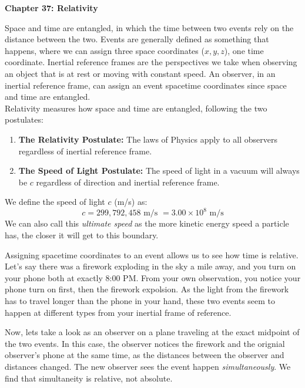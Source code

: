 \documentclass[11pt]{article}
\begin{document}
    \noindent \textbf{Chapter 37: Relativity}

    \vspace{1em}
    \noindent Space and time are entangled,
    in which the time between two events rely on the distance between the two.
    Events are generally defined as something that happens, where we can assign three space coordinates ($x,y,z$), one time coordinate.
    Inertial reference frames are the perspectives we take when observing an object that is at rest or moving with constant speed.
    An observer, in an inertial reference frame, can assign an event spacetime coordinates since space and time are entangled.\\
    
    \noindent \vspace{1em}
    Relativity measures how space and time are entangled, following the two postulates:
    \begin{enumerate}
      \item \textbf{The Relativity Postulate:}
        The laws of Physics apply to all observers regardless of inertial reference frame.
      \item \textbf{The Speed of Light Postulate:}
        The speed of light in  a vacuum will always be $c$ regardless of direction and inertial reference frame.
    \end{enumerate}    
    We define the speed of light $c$ (m/s) as:
    \begin{equation}
      c = 299,792,458 \text{ m/s } = 3.00 \times 10^8 \text{ m/s} \tag{speed of light}
    \end{equation}
    We can also call this \textit{ultimate speed} as the more kinetic energy speed a particle has, the closer it will get to this boundary.
    \vspace{1em}

    \noindent Assigning spacetime coordinates to an event allows us to see how time is relative.
    Let's say there was a firework exploding in the sky a mile away, and you turn on your phone both at exactly 8:00 PM.
    From your own observation, you notice your phone turn on first, then the firework expolsion.
    As the light from the firework has to travel longer than the phone in your hand,
    these two events seem to happen at different types from your inertial frame of reference.
    
    \vspace{1em}
    \noindent Now, lets take a look as an observer on a plane traveling at the exact midpoint of the two events.
    In this case, the observer notices the firework and the orignial observer's phone at the same time,
    as the distances between the observer and distances changed.
    The new observer sees the event happen \textit{simultaneously}.
    We find that simultaneity is relative, not absolute.
\end{document}
